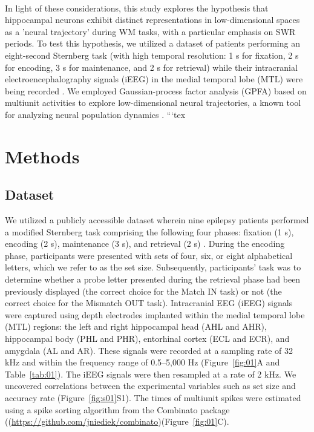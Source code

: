 \documentclass[final,3p,times,twocolumn]{elsarticle}
\newcommand{\REDSTARTS}{\color{red}}
\newcommand{\GREENENDS}{\color{black}}
\begin{document}
\begin{abstract\GREENENDS \REDSTARTS ll_Tables}
\\
\indent
In light of these considerations, this study explores the hypothesis that hippocampal neurons exhibit distinct representations in low-dimensional spaces as a 'neural trajectory' during WM tasks, with a particular emphasis on SWR periods. To test this hypothesis, we utilized a dataset of patients performing an eight-second Sternberg task (with high temporal resolution: 1 s for fixation, 2 s for encoding, 3 s for maintenance, and 2 s for retrieval) while their intracranial electroencephalography signals (iEEG) in the medial temporal lobe (MTL) were being recorded \cite{boran_dataset_2020}. We employed Gaussian-process factor analysis (GPFA) based on multiunit activities to explore low-dimensional neural trajectories, a known tool for analyzing neural population dynamics \cite{yu_gaussian-process_2009}.
\label{sec:introduction}```tex
\section{Methods}
\subsection{Dataset}
We utilized a publicly accessible dataset \cite{boran_dataset_2020} wherein nine epilepsy patients performed a modified Sternberg task comprising the following four phases: fixation (1 s), encoding (2 s), maintenance (3 s), and retrieval (2 s) \cite{boran_dataset_2020}. During the encoding phase, participants were presented with sets of four, six, or eight alphabetical letters, which we refer to as the set size. Subsequently, participants' task was to determine whether a probe letter presented during the retrieval phase had been previously displayed (the correct choice for the Match IN task) or not (the correct choice for the Mismatch OUT task). Intracranial EEG (iEEG) signals were captured using depth electrodes implanted within the medial temporal lobe (MTL) regions: the left and right hippocampal head (AHL and AHR), hippocampal body (PHL and PHR), entorhinal cortex (ECL and ECR), and amygdala (AL and AR). These signals were recorded at a sampling rate of 32 kHz and within the frequency range of 0.5--5,000 Hz (Figure~\ref{fig:01}A and Table~\ref{tab:01}). The iEEG signals were then resampled at a rate of 2 kHz. We uncovered correlations between the experimental variables such as set size and accuracy rate (Figure~\ref{fig:s01}S1). The times of multiunit spikes were estimated using a spike sorting algorithm \cite{niediek_reliable_2016} from the Combinato package ((\url{https://github.com/jniediek/combinato})(Figure~\ref{fig:01}C).


\end{abstract\GREENENDS \REDSTARTS ll_Tables}
\end{document}
